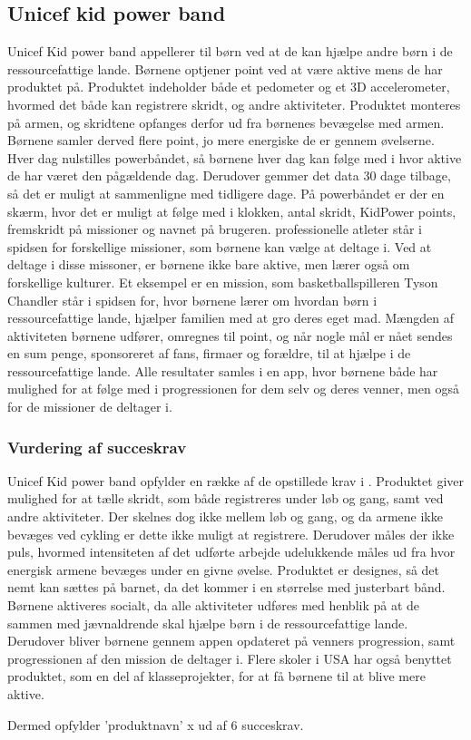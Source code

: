 \subsection{Unicef kid power band}
Unicef Kid power band appellerer til børn ved at de kan hjælpe andre børn i de ressourcefattige lande. Børnene optjener point ved at være  aktive mens de har produktet på. Produktet indeholder både et pedometer og et 3D accelerometer, hvormed det både kan registrere skridt, og andre aktiviteter. Produktet monteres på armen, og skridtene opfanges derfor ud fra børnenes bevægelse med armen. Børnene samler derved flere point, jo mere energiske de er gennem øvelserne. Hver dag nulstilles powerbåndet, så børnene hver dag kan følge med i hvor aktive de har været den pågældende dag. Derudover gemmer det data 30 dage tilbage, så det er muligt at sammenligne med tidligere dage. På powerbåndet er der en skærm, hvor det er muligt at følge med i klokken, antal skridt, KidPower points, fremskridt på missioner og navnet på brugeren.\citep{PowerAbout2015,PowerManual2015} \newline 
professionelle atleter står i spidsen for forskellige missioner, som børnene kan vælge at deltage i. Ved at deltage i disse missoner, er børnene ikke bare aktive, men lærer også om forskellige kulturer. Et eksempel er en mission, som basketballspilleren Tyson Chandler står i spidsen for, hvor børnene lærer om hvordan børn i ressourcefattige lande, hjælper familien med at gro deres eget mad.\citep{PowerMission2015} \newline
Mængden af aktiviteten børnene udfører, omregnes til point, og når nogle mål er nået sendes en sum penge, sponsoreret af fans, firmaer og forældre, til at hjælpe i de ressourcefattige lande. \newline
Alle resultater samles i en app, hvor børnene både har mulighed for at følge med i progressionen for dem selv og deres venner, men også for de missioner de deltager i.\citep{PowerAbout2015}


\subsubsection{Vurdering af succeskrav}
Unicef Kid power band opfylder en række af de opstillede krav i . Produktet giver mulighed for at tælle skridt, som både registreres under løb og gang, samt ved andre aktiviteter. Der skelnes dog ikke mellem løb og gang, og da armene ikke bevæges ved cykling er dette ikke muligt at registrere. Derudover måles der ikke puls, hvormed intensiteten af det udførte arbejde udelukkende måles ud fra hvor energisk armene bevæges under en givne øvelse. Produktet er designes, så det nemt kan sættes på barnet, da det kommer i en størrelse med justerbart bånd.\citep{PowerManual2015} \newline
Børnene aktiveres socialt, da alle aktiviteter udføres med henblik på at de sammen med jævnaldrende skal hjælpe børn i de ressourcefattige lande. Derudover bliver børnene gennem appen opdateret på venners progression, samt progressionen af den mission de deltager i. Flere skoler i USA har også benyttet produktet, som en del af klasseprojekter, for at få børnene til at blive mere aktive.\citep{PowerAbout2015}

Dermed opfylder 'produktnavn' x ud af 6 succeskrav.


